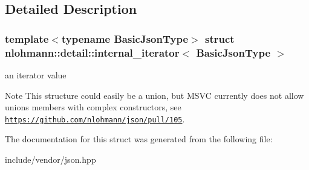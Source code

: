 \subsection{Detailed Description}
\subsubsection*{template$<$typename Basic\+Json\+Type$>$\newline
struct nlohmann\+::detail\+::internal\+\_\+iterator$<$ Basic\+Json\+Type $>$}

an iterator value 

\begin{DoxyNote}{Note}
This structure could easily be a union, but M\+S\+VC currently does not allow unions members with complex constructors, see \href{https://github.com/nlohmann/json/pull/105}{\tt https\+://github.\+com/nlohmann/json/pull/105}. 
\end{DoxyNote}


The documentation for this struct was generated from the following file\+:\begin{DoxyCompactItemize}
\item 
include/vendor/json.\+hpp\end{DoxyCompactItemize}
